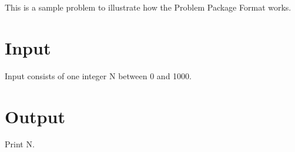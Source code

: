 This is a sample problem to illustrate how the Problem Package Format works.
\section*{Input}
Input consists of one integer N between 0 and 1000.
\section*{Output}
Print N.
